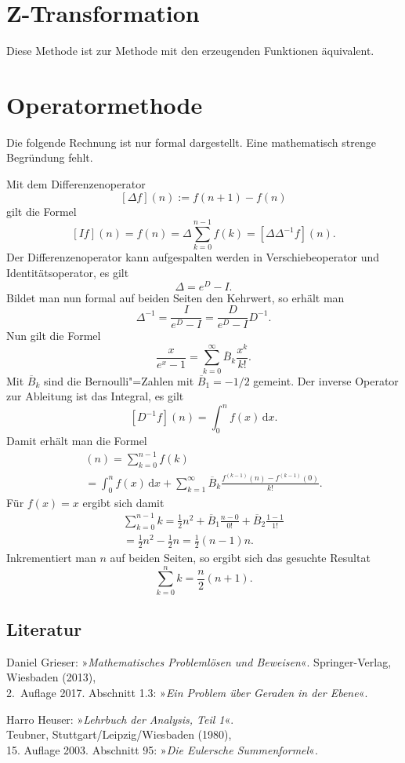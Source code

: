 \documentclass[a4paper,10pt,fleqn,twocolumn,twoside]{article}
\begin{document}
\section{Z-Transformation}

Diese Methode ist zur Methode mit den erzeugenden
Funktionen äquivalent.

\section{Operatormethode}

Die folgende Rechnung ist nur formal dargestellt. Eine
mathematisch strenge Begründung fehlt.

Mit dem Differenzenoperator
\[[\Delta f](n) := f(n+1)-f(n)\]
gilt die Formel
\[[If](n) = f(n) = \Delta\sum_{k=0}^{n-1}f(k)
= [\Delta\Delta^{-1}f](n).\]
Der Differenzenoperator kann aufgespalten werden in
Verschiebeoperator und Identitätsoperator, es gilt
\[\Delta = e^D-I.\]
Bildet man nun formal auf beiden Seiten den Kehrwert, so erhält
man
\[\Delta^{-1} = \frac{I}{e^D-I} = \frac{D}{e^D-I}D^{-1}.\]
Nun gilt die Formel
\[\frac{x}{e^x-1} = \sum_{k=0}^\infty \overline{B}_k \frac{x^k}{k!}.\]
Mit $\overline{B}_k$ sind die Bernoulli"=Zahlen mit
$\overline{B}_1=-1/2$ gemeint.
Der inverse Operator zur Ableitung ist das Integral, es gilt
\[[D^{-1}f](n) = \int_0^n f(x)\,\mathrm dx.\]
Damit erhält man die Formel
\begin{gather*}
[\Delta^{-1} f](n) = \sum_{k=0}^{n-1} f(k)\\
= \int_0^n f(x)\,\mathrm dx
+ \sum_{k=1}^\infty \overline{B}_k
\frac{f^{(k-1)}(n)-f^{(k-1)}(0)}{k!}.
\end{gather*}
Für $f(x)=x$ ergibt sich damit
\begin{gather*}
\sum_{k=0}^{n-1}k
= \frac{1}{2}n^2+\overline{B}_1 \frac{n-0}{0!}
+\overline{B}_2 \frac{1-1}{1!}\\
= \frac{1}{2}n^2-\frac{1}{2}n
= \frac{1}{2}(n-1)n.
\end{gather*}
Inkrementiert man $n$ auf beiden Seiten, so ergibt sich das
gesuchte Resultat
\[\sum_{k=0}^n k = \frac{n}{2}(n+1).\]

\subsection*{Literatur}

Daniel Grieser: »\emph{Mathematisches Problemlösen und Beweisen}«.
Springer-Verlag, Wiesbaden (2013),\\
2.~Auflage 2017.
Abschnitt 1.3: »\emph{Ein Problem über Geraden in der Ebene}«.

Harro Heuser: »\emph{Lehrbuch der Analysis, Teil 1}«.\\
Teubner, Stuttgart/Leipzig/Wiesbaden (1980),\\
15. Auflage 2003. Abschnitt 95: »\emph{Die Eulersche Summenformel}«.
\end{document}
